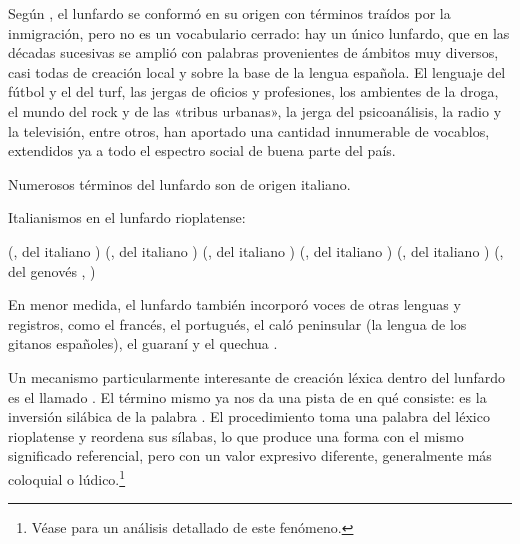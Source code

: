 \begin{recuadro}
Según \textcite[14]{conde2004}, el lunfardo se conformó en su origen con términos
traídos por la inmigración, pero no es un vocabulario cerrado: hay un único
lunfardo, que en las décadas sucesivas se amplió con palabras provenientes de
ámbitos muy diversos, casi todas de creación local y sobre la base de la lengua
española. El lenguaje del fútbol y el del turf, las jergas de oficios y
profesiones, los ambientes de la droga, el mundo del rock y de las «tribus
urbanas», la jerga del psicoanálisis, la radio y la televisión, entre otros, han
aportado una cantidad innumerable de vocablos, extendidos ya a todo el espectro
social de buena parte del país.
\end{recuadro}

Numerosos términos del lunfardo son de origen italiano.

\begin{exe}
  \ex\label{ex:15-italianismos} Italianismos en el lunfardo rioplatense:
    \begin{xlist}
      \ex {} (, del italiano )
      \ex {} (, del italiano )
      \ex {} (, del italiano
          )
      \ex {} (, del italiano )
      \ex {} (, del italiano )
      \ex {} (, del genovés , )
    \end{xlist}
\end{exe}

En menor medida, el lunfardo también incorporó voces de otras lenguas y
registros, como el francés, el portugués, el caló peninsular (la lengua de los
gitanos españoles), el guaraní y el quechua \parencite{conde2009}.

Un mecanismo particularmente interesante de creación léxica dentro del lunfardo
es el llamado . El término mismo ya nos da una pista de en qué
consiste:  es la inversión silábica de la palabra . El
procedimiento toma una palabra del léxico rioplatense y reordena sus sílabas, lo
que produce una forma con el mismo significado referencial, pero con un valor
expresivo diferente, generalmente más coloquial o lúdico.\footnote{Véase
\textcite{bohrn2015} para un análisis detallado de este fenómeno.}

